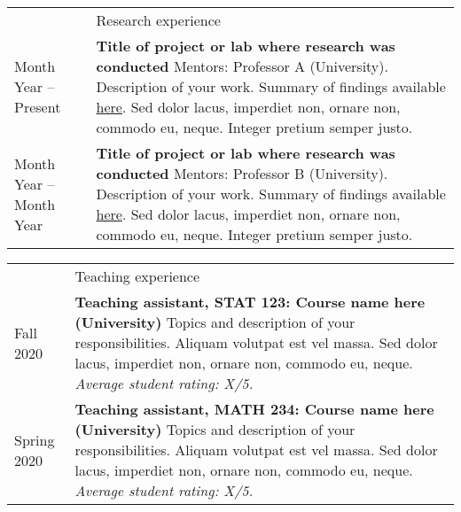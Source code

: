 \documentclass[letterpaper, 11pt]{article}
\newcommand{\headingfont}{\Large\color{OliveGreen}}
\newenvironment{SectionTable}[1]{
	\renewcommand*{\arraystretch}{1.6}
	\setlength{\tabcolsep}{10pt}
	\begin{longtable}[r]{R{1in} L{5.4in}} & #1 \\}
{\end{longtable}\vspace{-.3cm}}
\begin{document}
\begin{SectionTable}{\headingfont Research experience}
Month Year -- Present &
\textbf{Title of project or lab where research was conducted} \newline
Mentors: Professor A (University). \newline
Description of your work. Summary of findings available \href{https://en.wikibooks.org/wiki/LaTeX/Hyperlinks}{here}. Sed dolor lacus, imperdiet non, ornare non, commodo eu, neque. Integer pretium semper justo. \\

Month Year -- Month Year &
\textbf{Title of project or lab where research was conducted} \newline
Mentors: Professor B (University). \newline
Description of your work. Summary of findings available \href{https://en.wikibooks.org/wiki/LaTeX/Hyperlinks}{here}. Sed dolor lacus, imperdiet non, ornare non, commodo eu, neque. Integer pretium semper justo. \\
\end{SectionTable}


\begin{SectionTable}{\headingfont Teaching experience}
Fall 2020 & 
\textbf{Teaching assistant, STAT 123: Course name here (University)} \newline
Topics and description of your responsibilities. Aliquam volutpat est vel massa. Sed dolor lacus, imperdiet non, ornare non, commodo eu, neque. \newline
\textit{Average student rating: X/5.} \\

Spring 2020 & 
\textbf{Teaching assistant, MATH 234: Course name here (University)} \newline
Topics and description of your responsibilities. Aliquam volutpat est vel massa. Sed dolor lacus, imperdiet non, ornare non, commodo eu, neque. \newline
\textit{Average student rating: X/5.}
\end{SectionTable}

\end{document}
